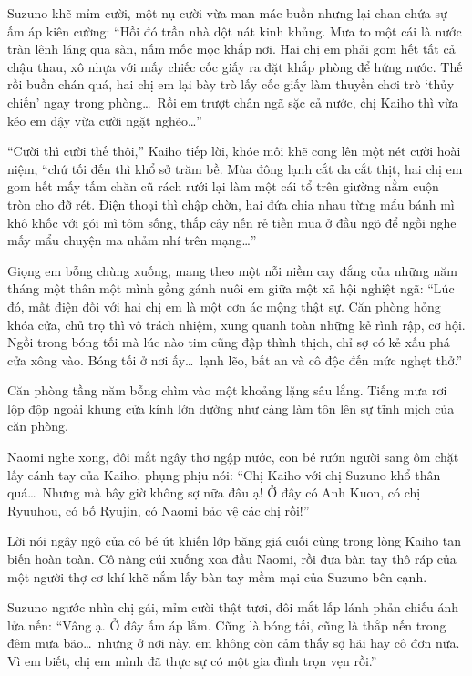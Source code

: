 \documentclass[../main.tex]{subfiles}
\begin{document}
Suzuno khẽ mỉm cười, một nụ cười vừa man mác buồn nhưng lại chan chứa sự ấm áp kiên cường: ``Hồi đó trần nhà dột nát kinh khủng. Mưa to một cái là nước tràn lênh láng qua sàn, nấm mốc mọc khắp nơi. Hai chị em phải gom hết tất cả chậu thau, xô nhựa với mấy chiếc cốc giấy ra đặt khắp phòng để hứng nước. Thế rồi buồn chán quá, hai chị em lại bày trò lấy cốc giấy làm thuyền chơi trò `thủy chiến' ngay trong phòng\dots\ Rồi em trượt chân ngã sặc cả nước, chị Kaiho thì vừa kéo em dậy vừa cười ngặt nghẽo\dots''

``Cười thì cười thế thôi,'' Kaiho tiếp lời, khóe môi khẽ cong lên một nét cười hoài niệm, ``chứ tối đến thì khổ sở trăm bề. Mùa đông lạnh cắt da cắt thịt, hai chị em gom hết mấy tấm chăn cũ rách rưới lại làm một cái tổ trên giường nằm cuộn tròn cho đỡ rét. Điện thoại thì chập chờn, hai đứa chia nhau từng mẩu bánh mì khô khốc với gói mì tôm sống, thắp cây nến rẻ tiền mua ở đầu ngõ để ngồi nghe mấy mẩu chuyện ma nhảm nhí trên mạng\dots''

Giọng em bỗng chùng xuống, mang theo một nỗi niềm cay đắng của những năm tháng một thân một mình gồng gánh nuôi em giữa một xã hội nghiệt ngã: ``Lúc đó, mất điện đối với hai chị em là một cơn ác mộng thật sự. Căn phòng hỏng khóa cửa, chủ trọ thì vô trách nhiệm, xung quanh toàn những kẻ rình rập, cơ hội. Ngồi trong bóng tối mà lúc nào tim cũng đập thình thịch, chỉ sợ có kẻ xấu phá cửa xông vào. Bóng tối ở nơi ấy\dots\ lạnh lẽo, bất an và cô độc đến mức nghẹt thở.''

Căn phòng tầng năm bỗng chìm vào một khoảng lặng sâu lắng. Tiếng mưa rơi lộp độp ngoài khung cửa kính lớn dường như càng làm tôn lên sự tĩnh mịch của căn phòng.

Naomi nghe xong, đôi mắt ngây thơ ngập nước, con bé rướn người sang ôm chặt lấy cánh tay của Kaiho, phụng phịu nói: ``Chị Kaiho với chị Suzuno khổ thân quá\dots\ Nhưng mà bây giờ không sợ nữa đâu ạ! Ở đây có Anh Kuon, có chị Ryuuhou, có bố Ryujin, có Naomi bảo vệ các chị rồi!''

Lời nói ngây ngô của cô bé út khiến lớp băng giá cuối cùng trong lòng Kaiho tan biến hoàn toàn. Cô nàng cúi xuống xoa đầu Naomi, rồi đưa bàn tay thô ráp của một người thợ cơ khí khẽ nắm lấy bàn tay mềm mại của Suzuno bên cạnh.

Suzuno ngước nhìn chị gái, mỉm cười thật tươi, đôi mắt lấp lánh phản chiếu ánh lửa nến: ``Vâng ạ. Ở đây ấm áp lắm. Cũng là bóng tối, cũng là thắp nến trong đêm mưa bão\dots\ nhưng ở nơi này, em không còn cảm thấy sợ hãi hay cô đơn nữa. Vì em biết, chị em mình đã thực sự có một gia đình trọn vẹn rồi.''
\end{document}
